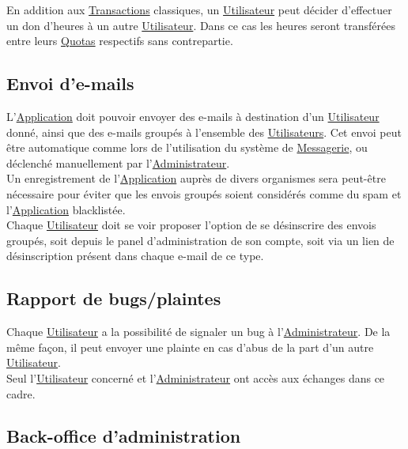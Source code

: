 \documentclass[french,12pt]{article}
\begin{document}
			En addition aux \hyperlink{transaction}{Transactions} classiques, un
			 \hyperlink{utilisateur}{Utilisateur} peut décider d’effectuer un don
			 d’heures à un autre \hyperlink{utilisateur}{Utilisateur}. Dans ce cas les
			 heures seront transférées entre leurs \hyperlink{quota}{Quotas}
			 respectifs sans contrepartie.

		\subsection{Envoi d’e-mails}

			L’\hyperlink{application}{Application} doit pouvoir envoyer des e-mails à
			 destination d’un \hyperlink{utilisateur}{Utilisateur} donné, ainsi que
			 des e-mails groupés à l’ensemble des
			 \hyperlink{utilisateur}{Utilisateurs}. Cet envoi peut être automatique
			 comme lors de l’utilisation du système de
			 \hyperlink{messagerie}{Messagerie}, ou déclenché manuellement par
			 l’\hyperlink{administrateur}{Administrateur}.\\

			Un enregistrement de l’\hyperlink{application}{Application} auprès de
			 divers organismes sera peut-être nécessaire pour éviter que les envois
			 groupés soient considérés comme du spam et
			 l’\hyperlink{application}{Application} blacklistée.\\

			Chaque \hyperlink{utilisateur}{Utilisateur} doit se voir proposer l’option
			 de se désinscrire des envois groupés, soit depuis le panel
			 d’administration de son compte, soit via un lien de désinscription
			 présent dans chaque e-mail de ce type.

		\subsection{Rapport de bugs/plaintes}

			Chaque \hyperlink{utilisateur}{Utilisateur} a la possibilité de signaler
			 un bug à l’\hyperlink{administrateur}{Administrateur}. De la même façon,
			 il peut envoyer une plainte en cas d’abus de la part d’un autre
			 \hyperlink{utilisateur}{Utilisateur}.\\
			Seul l’\hyperlink{utilisateur}{Utilisateur} concerné et
			 l’\hyperlink{administrateur}{Administrateur} ont accès aux échanges dans
			 ce cadre.

		\newpage
		\subsection{Back-office d’administration}
\end{document}
